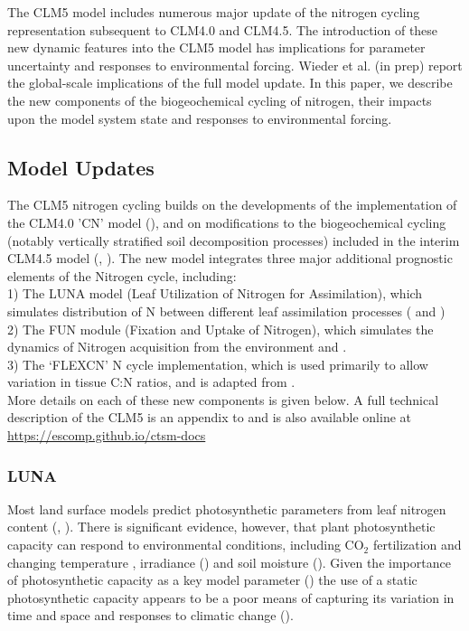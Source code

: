 \documentclass[draft,linenumbers]{agujournal}
\begin{document}
The CLM5 model includes numerous major update of the nitrogen cycling representation subsequent to CLM4.0 and CLM4.5. The introduction of these new dynamic features into the CLM5 model has implications for parameter uncertainty and responses to environmental forcing. Wieder et al. (in prep) report the global-scale implications of the full model update.  In this paper, we describe the new components of the biogeochemical cycling of nitrogen, their impacts upon the model system state and responses to environmental forcing. 


\subsection{Model Updates}
The CLM5 nitrogen cycling builds on the developments of the implementation of the CLM4.0 'CN' model (\cite{thornton2007}), and on modifications to the biogeochemical cycling (notably vertically stratified soil decomposition processes) included in the interim CLM4.5 model (\cite{koven2013}, \cite{bonan2012}).  The new model integrates three major additional prognostic elements of the Nitrogen cycle, including: \\

1)	The LUNA model (Leaf Utilization of Nitrogen for Assimilation), which simulates distribution of N between different leaf assimilation processes ( \cite{xu2012} and \cite{ali2016}) \\
2)  The FUN module (Fixation and Uptake of Nitrogen), which simulates the dynamics of Nitrogen acquisition from the environment \cite{fisher2010fun} \cite{brzostek2014} and \cite{shi2016}.\\
3)	The `FLEXCN' N cycle implementation, which is used primarily to allow variation in tissue C:N ratios, and is adapted from \cite{ghimire2016}.\\


More details on each of these new components is given below. A full technical description of the CLM5 is an appendix to \cite{lawrence2018} and is also available online at \url{https://escomp.github.io/ctsm-docs}

\subsubsection{LUNA}

Most land surface models predict photosynthetic parameters from leaf nitrogen content (\cite{kattge2009}, \cite{bonan2012}). There is significant evidence, however, that plant photosynthetic capacity can respond to environmental conditions, including CO$_{2}$ fertilization \cite{ainsworth2007} and changing temperature \cite{hikosaka2005}, irradiance (\cite{niinemets1998}) and soil moisture (\cite{keenan2009}). Given the importance of photosynthetic capacity as a key model parameter (\cite{rogers2017}) the use of a static photosynthetic capacity appears to be a poor means of capturing its variation in time and space and responses to climatic change (\cite{walker2017}).
\end{document}
